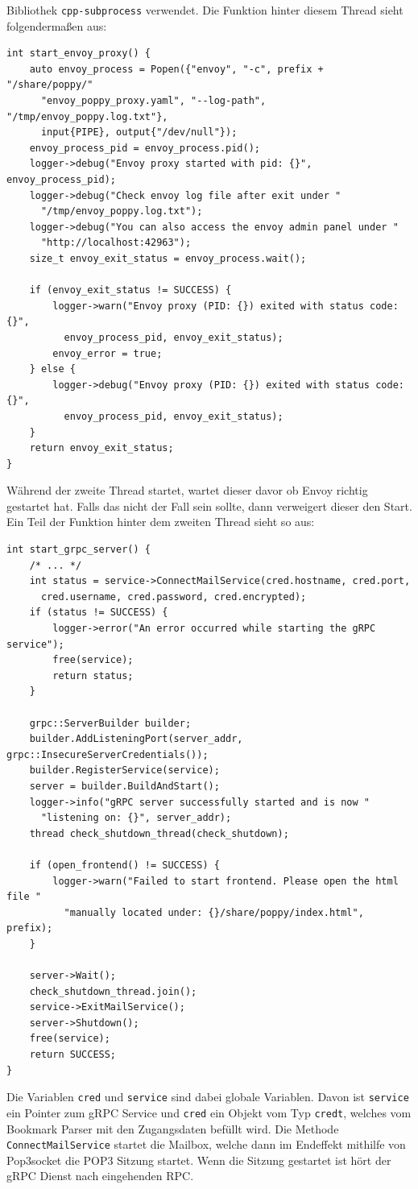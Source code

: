 \documentclass[12pt]{article}
\def\code#1{\texttt{#1}}
\begin{document}
Bibliothek \code{cpp-subprocess} verwendet. Die Funktion hinter diesem Thread 
sieht folgendermaßen aus:
\begin{verbatim}
int start_envoy_proxy() {
    auto envoy_process = Popen({"envoy", "-c", prefix + "/share/poppy/"
      "envoy_poppy_proxy.yaml", "--log-path", "/tmp/envoy_poppy.log.txt"}, 
      input{PIPE}, output{"/dev/null"});
    envoy_process_pid = envoy_process.pid();
    logger->debug("Envoy proxy started with pid: {}", envoy_process_pid);
    logger->debug("Check envoy log file after exit under "
      "/tmp/envoy_poppy.log.txt");
    logger->debug("You can also access the envoy admin panel under "
      "http://localhost:42963");
    size_t envoy_exit_status = envoy_process.wait();

    if (envoy_exit_status != SUCCESS) {
        logger->warn("Envoy proxy (PID: {}) exited with status code: {}",
          envoy_process_pid, envoy_exit_status);
        envoy_error = true;
    } else {
        logger->debug("Envoy proxy (PID: {}) exited with status code: {}",
          envoy_process_pid, envoy_exit_status);
    }
    return envoy_exit_status;
}
\end{verbatim}
Während der zweite Thread startet, wartet dieser davor ob Envoy richtig
gestartet hat. Falls das nicht der Fall sein sollte, dann verweigert dieser den
Start. Ein Teil der Funktion hinter dem zweiten Thread sieht so aus:
\begin{verbatim}
int start_grpc_server() {
    /* ... */
    int status = service->ConnectMailService(cred.hostname, cred.port, 
      cred.username, cred.password, cred.encrypted);
    if (status != SUCCESS) {
        logger->error("An error occurred while starting the gRPC service");
        free(service);
        return status;
    }
    
    grpc::ServerBuilder builder;
    builder.AddListeningPort(server_addr, grpc::InsecureServerCredentials());
    builder.RegisterService(service);
    server = builder.BuildAndStart();
    logger->info("gRPC server successfully started and is now "
      "listening on: {}", server_addr);
    thread check_shutdown_thread(check_shutdown);
    
    if (open_frontend() != SUCCESS) { 
        logger->warn("Failed to start frontend. Please open the html file "
          "manually located under: {}/share/poppy/index.html", prefix); 
    }

    server->Wait();
    check_shutdown_thread.join();
    service->ExitMailService();
    server->Shutdown();
    free(service);
    return SUCCESS;
}
\end{verbatim}
Die Variablen \code{cred} und \code{service} sind dabei globale Variablen.
Davon ist \code{service} ein Pointer zum gRPC Service und \code{cred} ein 
Objekt vom Typ \code{cred\textunderscore t}, welches vom Bookmark Parser mit den 
Zugangsdaten befüllt wird.
\newline
Die Methode \code{ConnectMailService} startet die Mailbox, welche dann im
Endeffekt mithilfe von Pop3socket die POP3 Sitzung startet. Wenn die Sitzung 
gestartet ist hört der gRPC Dienst nach eingehenden RPC.
\end{document}
